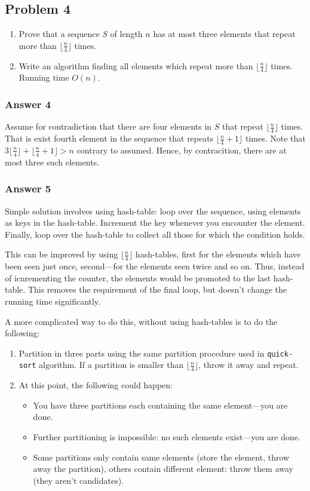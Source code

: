 \documentclass[11pt]{article}
\begin{document}
\subsection{Problem 4}
\label{sec-1-4}
\begin{enumerate}
\item Prove that a sequence $S$ of length $n$ has at most three elements that
repeat more than $\lfloor\frac{n}{4}\rfloor$ times.
\item Write an algorithm finding all elements which repeat more than
$\lfloor\frac{n}{4}\rfloor$ times.  Running time $O(n)$.
\end{enumerate}

\subsubsection{Answer 4}
\label{sec-1-4-1}
Assume for contradiction that there are four elements in $S$ that repeat
$\lfloor\frac{n}{4}\rfloor$ times.  That is exist fourth element in the
sequence that repeats $\lfloor\frac{n}{4} + 1\rfloor$ times.  Note that
$3\lfloor\frac{n}{4}\rfloor + \lfloor\frac{n}{4} + 1\rfloor > n$ contrary to
assumed.  Hence, by contracition, there are at most three such elements.

\subsubsection{Answer 5}
\label{sec-1-4-2}
Simple solution involves using hash-table: loop over the sequence, using
elements as keys in the hash-table.  Increment the key whenever you
encounter the element.  Finally, loop over the hash-table to collect all
those for which the condition holds.

This can be improved by using $\lfloor\frac{n}{4}\rfloor$ hash-tables, first
for the elements which have been seen just once, second---for the elements
seen twice and so on.  Thus, instead of icnrementing the counter, the
elements would be promoted to the last hash-table.  This removes the
requirement of the final loop, but doesn't change the running time
significantly.

A more complicated way to do this, without using hash-tables is to do the
following:
\begin{enumerate}
\item Partition in three parts using the same partition procedure used in
\texttt{quick-sort} algorithm.  If a partition is smaller than
$\lfloor\frac{n}{4}\rfloor$, throw it away and repeat.
\item At this point, the following could happen:
\begin{itemize}
\item You have three partitions each containing the same element---you are
done.
\item Further partitioning is impossible: no such elements exist---you are
done.
\item Some partitions only contain same elements (store the element, throw
away the partition), others contain different element: throw them away
(they aren't candidates).
\end{itemize}
\end{enumerate}
\end{document}
